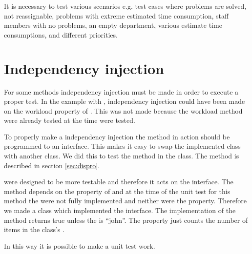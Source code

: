 \begin{comment}
\begin{lstlisting}[style=sourceCode, caption=\myCaption{An example unit test which tests a specific instance of the balanceWorkload method.}, label=lst:balanceWorkloadTestAssert]
[TestMethod()]
.
.
.
target.BalanceWorkload();
Assert.IsTrue(
			(john.Worklist.Contains(john.Workload == 30 && mike.Workload == 20) || 
			(mike.Workload == 30 && john.Workload == 20)
		     ));
.
.
.
\end{lstlisting}
\end{comment}
It is necessary to test various scenarios e.g. test cases where problems are solved, not reassignable, problems with extreme estimated time consumption, staff members with no problems, an empty department, various estimate time consumptions, and different priorities. 


\section{Independency injection}
\label{sec:independencyInjection}
For some methods independency injection must be made in order to execute a proper test. 
In the example with , independency injection could have been made on the workload property of . 
This was not made because the workload method were already tested at the time  were tested.

To properly make a independency injection the method in action should be programmed to an interface. 
This makes it easy to swap the implemented class with another class. 
We did this to test the method  in the  class. 
The method is described in section \ref{sec:dispro}.

 were designed to be more testable and therefore it acts on the  interface. 
The method depends on the  property of  and at the time of the unit test for this method the  were not fully implemented and neither were the  property. 
Therefore we made a  class which implemented the  interface.
The  implementation of the  method returns true unless the  is ``john''. 
The  property just counts the number of items in the  class's . 

In this way it is possible to make a unit test work. 

